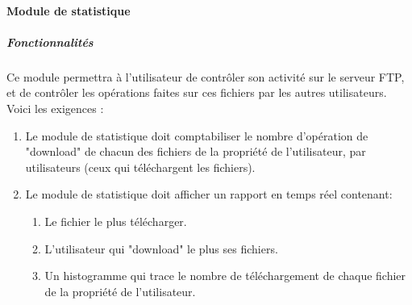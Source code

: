 \documentclass[10pt,a4paper]{report}
\begin{document}
\paragraph{Module de statistique}

	\subparagraph{Fonctionnalités}

	Ce module permettra à l'utilisateur de contrôler son activité sur le serveur FTP, et de contrôler les opérations faites sur ces fichiers par les autres utilisateurs.\\

	Voici les exigences :
		\begin{enumerate}

			\item Le module de statistique doit comptabiliser le nombre d'opération de "download" de chacun des fichiers de la propriété de l'utilisateur, par utilisateurs (ceux qui téléchargent les fichiers).

			\item Le module de statistique doit afficher un rapport en temps réel contenant: 

			\begin{enumerate}[label=\arabic*.]
				\item Le fichier le plus télécharger.
				\item L'utilisateur qui "download" le plus ses fichiers.
				\item Un histogramme qui trace le nombre de téléchargement de chaque fichier de la propriété de l'utilisateur.
			\end{enumerate} 
		\end{enumerate}
\end{document}
